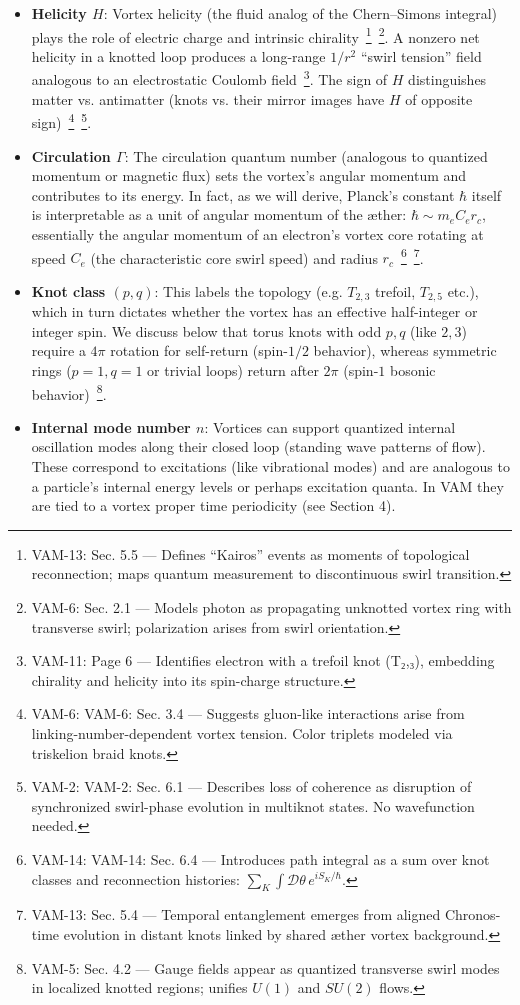 \documentclass[a4paper,12pt]{article}
\begin{document}
    \begin{itemize}
        \item \textbf{Helicity $H$}: Vortex helicity (the fluid analog of the Chern–Simons integral) plays the role of electric charge and intrinsic chirality~\footnote{VAM-13: Sec. 5.5 — Defines “Kairos” events as moments of topological reconnection; maps quantum measurement to discontinuous swirl transition.}~\footnote{VAM-6: Sec. 2.1 — Models photon as propagating unknotted vortex ring with transverse swirl; polarization arises from swirl orientation.}. A nonzero net helicity in a knotted loop produces a long-range $1/r^2$ “swirl tension” field analogous to an electrostatic Coulomb field~\footnote{VAM-11: Page 6 — Identifies electron with a trefoil knot (T₂,₃), embedding chirality and helicity into its spin-charge structure.}. The sign of $H$ distinguishes matter vs. antimatter (knots vs. their mirror images have $H$ of opposite sign)~\footnote{VAM-6: VAM-6: Sec. 3.4 — Suggests gluon-like interactions arise from linking-number-dependent vortex tension. Color triplets modeled via triskelion braid knots.}~\footnote{VAM-2: VAM-2: Sec. 6.1 — Describes loss of coherence as disruption of synchronized swirl-phase evolution in multiknot states. No wavefunction needed.}.
        \item \textbf{Circulation $\Gamma$}: The circulation quantum number (analogous to quantized momentum or magnetic flux) sets the vortex’s angular momentum and contributes to its energy. In fact, as we will derive, Planck’s constant $\hbar$ itself is interpretable as a unit of angular momentum of the æther: $\hbar \sim m_e C_e r_c$, essentially the angular momentum of an electron’s vortex core rotating at speed $C_e$ (the characteristic core swirl speed) and radius $r_c$~\footnote{VAM-14: VAM-14: Sec. 6.4 — Introduces path integral as a sum over knot classes and reconnection histories: $\sum_{K} \int \mathcal{D}\theta\, e^{iS_K/\hbar}$.}~\footnote{VAM-13: Sec. 5.4 — Temporal entanglement emerges from aligned Chronos-time evolution in distant knots linked by shared æther vortex background.}.
        \item \textbf{Knot class $(p,q)$}: This labels the topology (e.g. $T_{2,3}$ trefoil, $T_{2,5}$ etc.), which in turn dictates whether the vortex has an effective half-integer or integer spin. We discuss below that torus knots with odd $p,q$ (like $2,3$) require a $4\pi$ rotation for self-return (spin-$1/2$ behavior), whereas symmetric rings ($p=1,q=1$ or trivial loops) return after $2\pi$ (spin-$1$ bosonic behavior)~\footnote{VAM-5: Sec. 4.2 — Gauge fields appear as quantized transverse swirl modes in localized knotted regions; unifies $U(1)$ and $SU(2)$ flows.}.
        \item \textbf{Internal mode number $n$}: Vortices can support quantized internal oscillation modes along their closed loop (standing wave patterns of flow). These correspond to excitations (like vibrational modes) and are analogous to a particle’s internal energy levels or perhaps excitation quanta. In VAM they are tied to a vortex proper time periodicity (see Section 4).
    \end{itemize}
\end{document}

